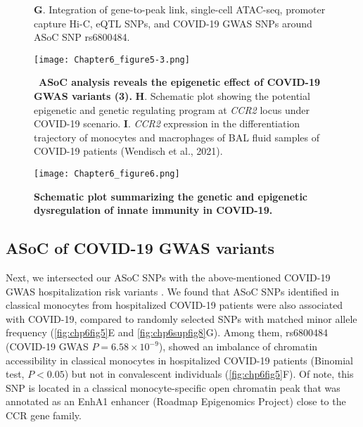 \documentclass{book}
\begin{document}
\begin{refsection}
\begin{figure}
{    \textbf{G}. Integration of gene-to-peak link, single-cell ATAC-seq, promoter capture Hi-C, eQTL SNPs, and COVID-19 GWAS SNPs around ASoC SNP rs6800484.
  }
\end{figure}
\begin{figure}%
  \centering
  \addtocounter{figure}{-1}
  \texttt{[image: Chapter6\_figure5-3.png]}
  \caption{
    ~\textbf{ASoC analysis reveals the epigenetic effect of COVID-19 GWAS variants (3).}
    \textbf{H}. Schematic plot showing the potential epigenetic and genetic regulating program at \textit{CCR2} locus under COVID-19 scenario.
    \textbf{I}. \textit{CCR2} expression in the differentiation trajectory of monocytes and macrophages of BAL fluid samples of COVID-19 patients (Wendisch et al., 2021).
  }
\end{figure}

\begin{landscape}
\begin{figure}
  \centering
  \texttt{[image: Chapter6\_figure6.png]}
  \caption{\label{fig:chp6fig6}
    \textbf{Schematic plot summarizing the genetic and epigenetic dysregulation of innate immunity in COVID-19.}
  }
\end{figure}
\end{landscape}

\subsection*{ASoC of COVID-19 GWAS variants}
Next, we intersected our ASoC SNPs with the above-mentioned COVID-19 GWAS hospitalization risk variants \cite{Niemi2021Mapping}.
We found that ASoC SNPs identified in classical monocytes from hospitalized COVID-19 patients were also associated with COVID-19, compared to randomly selected SNPs with matched minor allele frequency (\ref{fig:chp6fig5}E and \ref{fig:chp6supfig8}G).
Among them, rs6800484 (COVID-19 GWAS $P = 6.58 \times 10^{-9}$), showed an imbalance of chromatin accessibility in classical monocytes in hospitalized COVID-19 patients (Binomial test, $P < 0.05$) but not in convalescent individuals (\ref{fig:chp6fig5}F).
Of note, this SNP is located in a classical monocyte-specific open chromatin peak that was annotated as an EnhA1 enhancer (Roadmap Epigenomics Project) \cite{Bernstein2010The} close to the CCR gene family.


\end{refsection}
\end{document}
